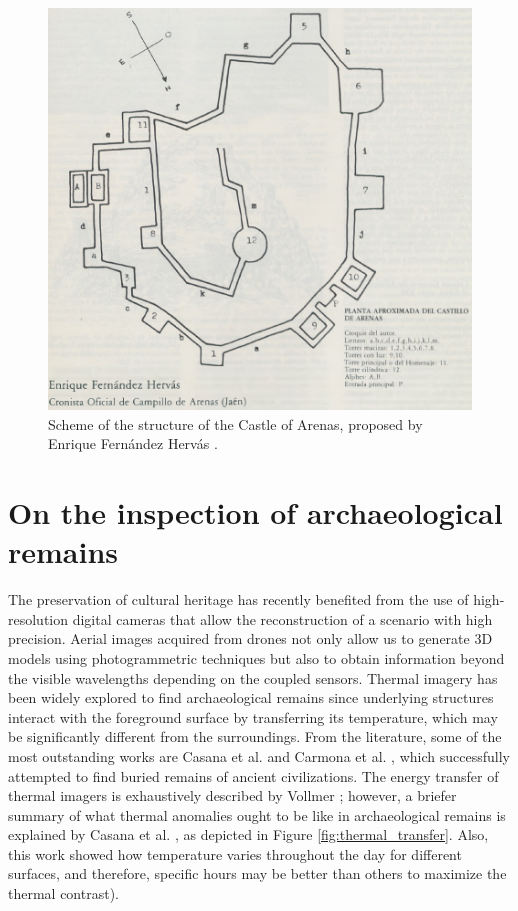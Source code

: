 \begin{figure}[ht]
  \centering
  \includegraphics[width=\linewidth]{figs/castle_puerta_arenas/castle_ideation_scheme.PNG}
  \caption{Scheme of the structure of the Castle of Arenas, proposed by Enrique Fernández Hervás \cite{fernandez_hervas_castillo_1986}.}
  \label{fig:castle_ideation_scheme}
\end{figure}

\section{On the inspection of archaeological remains}

The preservation of cultural heritage has recently benefited from the use of high-resolution digital cameras that allow the reconstruction of a scenario with high precision. Aerial images acquired from drones not only allow us to generate 3D models using photogrammetric techniques but also to obtain information beyond the visible wavelengths depending on the coupled sensors. Thermal imagery has been widely explored to find archaeological remains since underlying structures interact with the foreground surface by transferring its temperature, which may be significantly different from the surroundings. From the literature, some of the most outstanding works are Casana et al. \cite{casana_archaeological_2017} and Carmona et al. \cite{salgado_carmona_assessing_2020}, which successfully attempted to find buried remains of ancient civilizations. The energy transfer of thermal imagers is exhaustively described by Vollmer \cite{vollmer_infrared_2017}; however, a briefer summary of what thermal anomalies ought to be like in archaeological remains is explained by Casana et al. \cite{casana_archaeological_2017}, as depicted in Figure \ref{fig:thermal_transfer}. Also, this work showed how temperature varies throughout the day for different surfaces, and therefore, specific hours may be better than others to maximize the thermal contrast).

